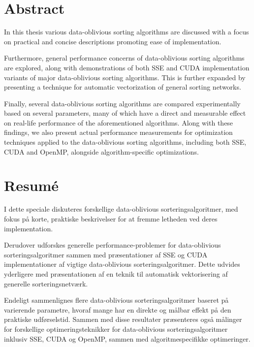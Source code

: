 \chapter*{Abstract}

In this thesis various data-oblivious sorting algorithms are discussed with a focus on practical and concise descriptions promoting ease of implementation.

Furthermore, general performance concerns of data-oblivious  sorting algorithms are explored, along with demonstrations of both SSE and CUDA implementation variants of major data-oblivious sorting algorithms. This is further expanded by presenting a technique for automatic vectorization of general sorting networks.

Finally, several data-oblivious sorting algorithms are compared experimentally based on several parameters, many of which have a direct and measurable effect on real-life performance of the aforementioned algorithms. Along with these findings, we also present actual performance measurements for optimization techniques applied to the data-oblivious sorting algorithms, including both SSE, CUDA and OpenMP, alongside algorithm-specific optimizations. 

\chapter*{Resum\'e}


I dette speciale diskuteres forskellige data-oblivious sorteringsalgoritmer, med fokus på korte, praktiske beskrivelser for at fremme letheden ved deres implementation.

Derudover udforskes generelle performance-problemer for data-oblivious sorteringsalgoritmer sammen med præsentationer af SSE og CUDA implementationer af vigtige data-oblivious sorteringsalgoritmer.
Dette udvides yderligere med præsentationen af en teknik til automatisk vektorisering af generelle sorteringsnetværk.

Endeligt sammenlignes flere data-oblivious sorteringsalgoritmer baseret på varierende parametre, hvoraf mange har en direkte og målbar effekt på den praktiske udførselstid. Sammen med disse resultater præsenteres også målinger for forskellige optimeringsteknikker for data-oblivious sorteringsalgoritmer inklusiv SSE, CUDA og OpenMP, sammen med algoritmespecifikke optimeringer.


